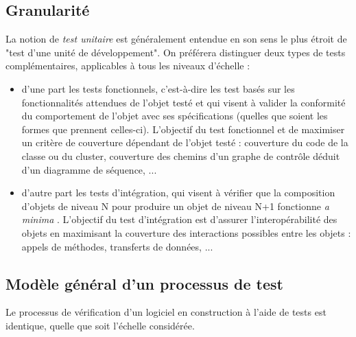 \par
  
\subsection{Granularit\'e}
  
    La notion de 
\emph{test unitaire}
   est g\'en\'eralement entendue
    en son sens le plus \'etroit de "test d'une unit\'e de
    d\'eveloppement". On pr\'ef\'erera distinguer deux types de tests
    compl\'ementaires, applicables \`a tous les niveaux d'\'echelle :
    
\begin{itemize}
       
\item d'une part les tests fonctionnels, c'est-\`a-dire les test
      bas\'es sur les fonctionnalit\'es attendues de l'objet test\'e et qui
      visent \`a valider la conformit\'e du comportement de l'objet avec
      ses sp\'ecifications (quelles que soient les formes que prennent
      celles-ci). L'objectif du test fonctionnel et de maximiser un
       crit\`ere de couverture d\'ependant de l'objet test\'e : couverture du
      code de la classe ou du cluster, couverture des chemins d'un
      graphe de contr\^ole d\'eduit d'un diagramme de s\'equence, ...
      
\item 
       d'autre part les tests d'int\'egration, qui visent \`a v\'erifier que
      la composition d'objets de niveau N pour produire un objet de
      niveau N+1 fonctionne 
\emph{a minima}
  . L'objectif du test
      d'int\'egration est d'assurer l'interop\'erabilit\'e des objets en
      maximisant la couverture des interactions possibles entre les
      objets : appels de m\'ethodes, transferts de donn\'ees, ...
     
\end{itemize}
  
\par
  
\par
  
\subsection{Mod\`ele g\'en\'eral d'un processus de test}
  Le processus de v\'erification d'un logiciel en construction \`a
    l'aide de tests est identique, quelle que soit l'\'echelle
    consid\'er\'ee. 
    
